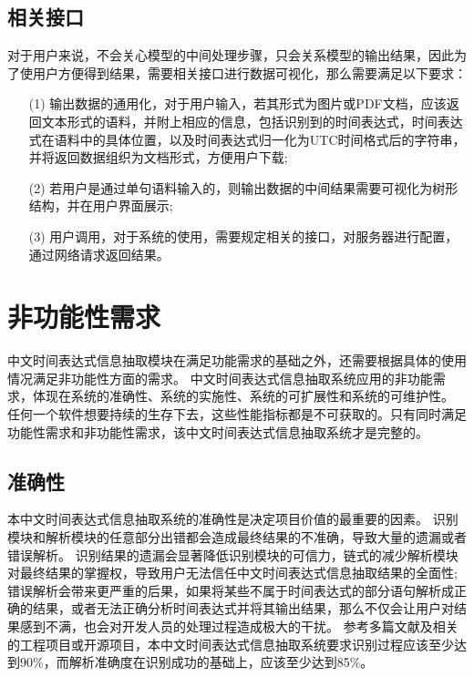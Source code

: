\subsection{相关接口}

对于用户来说，不会关心模型的中间处理步骤，只会关系模型的输出结果，因此为了使用户方便得到结果，需要相关接口进行数据可视化，那么需要满足以下要求：
\begin{enumerate}
    \item[(1)] 输出数据的通用化，对于用户输入，若其形式为图片或PDF文档，应该返回文本形式的语料，并附上相应的信息，包括识别到的时间表达式，时间表达式在语料中的具体位置，以及时间表达式归一化为UTC时间格式后的字符串，并将返回数据组织为文档形式，方便用户下载;
    \item[(2)] 若用户是通过单句语料输入的，则输出数据的中间结果需要可视化为树形结构，并在用户界面展示;
    \item[(3)]  用户调用，对于系统的使用，需要规定相关的接口，对服务器进行配置，通过网络请求返回结果。
\end{enumerate}

\section{非功能性需求}

中文时间表达式信息抽取模块在满足功能需求的基础之外，还需要根据具体的使用情况满足非功能性方面的需求。
中文时间表达式信息抽取系统应用的非功能需求，体现在系统的准确性、系统的实施性、系统的可扩展性和系统的可维护性。
任何一个软件想要持续的生存下去，这些性能指标都是不可获取的。只有同时满足功能性需求和非功能性需求，该中文时间表达式信息抽取系统才是完整的。

\subsection{准确性}

本中文时间表达式信息抽取系统的准确性是决定项目价值的最重要的因素。
识别模块和解析模块的任意部分出错都会造成最终结果的不准确，导致大量的遗漏或者错误解析。
识别结果的遗漏会显著降低识别模块的可信力，链式的减少解析模块对最终结果的掌握权，导致用户无法信任中文时间表达式信息抽取结果的全面性;
错误解析会带来更严重的后果，如果将某些不属于时间表达式的部分语句解析成正确的结果，或者无法正确分析时间表达式并将其输出结果，那么不仅会让用户对结果感到不满，也会对开发人员的处理过程造成极大的干扰。
参考多篇文献及相关的工程项目或开源项目，本中文时间表达式信息抽取系统要求识别过程应该至少达到90\%，而解析准确度在识别成功的基础上，应该至少达到85\%。


